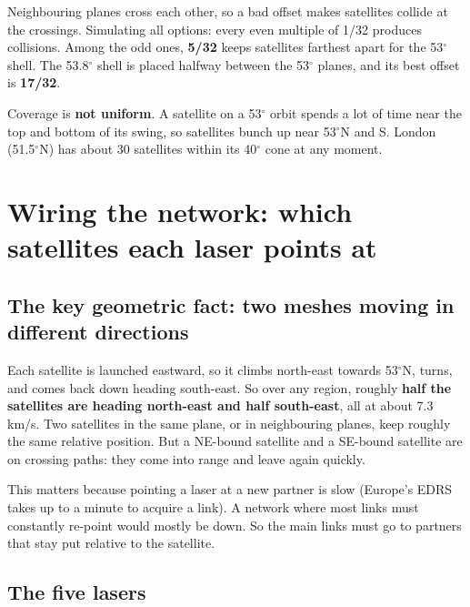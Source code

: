 Neighbouring planes cross each other, so a bad offset makes satellites collide at the crossings. Simulating all options: every even multiple of 1/32 produces
collisions. Among the odd ones, \textbf{5/32} keeps satellites farthest apart for the 53$^\circ$ shell. The 53.8$^\circ$ shell is placed halfway between the
53$^\circ$ planes, and its best offset is \textbf{17/32}.


Coverage is \textbf{not uniform}. A satellite on a 53$^\circ$ orbit spends a lot of time near the top and bottom of its swing, so satellites bunch up near
53$^\circ$N and S. London (51.5$^\circ$N) has about 30 satellites within its 40$^\circ$ cone at any moment.

\section{Wiring the network: which satellites each laser points at}

\subsection{The key geometric fact: two meshes moving in different directions}
Each satellite is launched eastward, so it climbs north-east towards 53$^\circ$N, turns, and comes back down heading south-east. So over any region, roughly
\textbf{half the satellites are heading north-east and half south-east}, all at about 7.3\,km/s. Two satellites in the same plane, or in neighbouring planes, keep
roughly the same relative position. But a NE-bound satellite and a SE-bound satellite are on crossing paths: they come into range and leave again quickly.

This matters because pointing a laser at a new partner is slow (Europe's EDRS takes up to a minute to acquire a link). A network where most links must
constantly re-point would mostly be down. So the main links must go to partners that stay put relative to the satellite.

\subsection{The five lasers}


